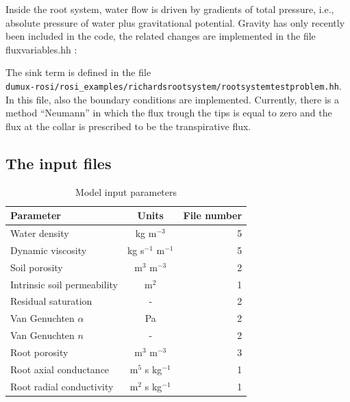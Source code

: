 Inside the root system, water flow is driven by gradients of total pressure, i.e., absolute pressure of water plus gravitational potential. Gravity has only recently been included in the code, the related changes are implemented in the file fluxvariables.hh :
	

The sink term is defined in the file\\
\verb+dumux-rosi/rosi_examples/richardsrootsystem/rootsystemtestproblem.hh+.\\
	

In this file, also the boundary conditions are implemented.
Currently, there is a method “Neumann” in which the flux trough the tips is equal to zero and the flux at the collar is prescribed to be the transpirative flux. 
	


\subsection*{The input files}
% 
\begin{table}[h!]
	\captionsetup{labelformat=empty}
  \caption{Model input parameters}
  \label{tab:inputs}
  \begin{tabular}{l|c||r}
    \textbf{Parameter}  & \textbf{Units} & \textbf{File number}\\
    \hline
    Water density & kg m$^{-3}$ & 5\\
    Dynamic viscosity & kg s$^{-1}$ m$^{-1}$& 5\\		
    Soil porosity & m$^3$ m$^{-3}$ & 2\\		
		Intrinsic soil permeability & m$^2$ & 1\\
		Residual saturation & - & 2\\	
		Van Genuchten $\alpha$ & Pa & 2\\
		Van Genuchten $n$ & - & 2\\		
    Root porosity & m$^3$ m$^{-3}$ & 3\\	
		Root axial conductance & m$^5$ s kg$^{-1}$ & 1\\
		Root radial conductivity & m$^2$ s kg$^{-1}$ & 1\\		
  \end{tabular}
\end{table}

